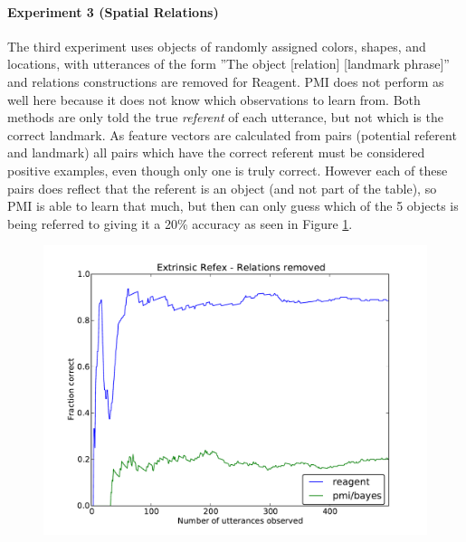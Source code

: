 \documentclass[12pt]{article}
\begin{document}
\paragraph{Experiment 3 (Spatial Relations)}
The third experiment uses objects of randomly assigned colors, shapes, and locations, with utterances of the form ''The object [relation] [landmark phrase]'' and relations constructions are removed for Reagent. PMI does not perform as well here because it does not know which observations to learn from. Both methods are only told the true \textit{referent} of each utterance, but not which is the correct landmark. As feature vectors are calculated from pairs (potential referent and landmark) all pairs which have the correct referent must be considered positive examples, even though only one is truly correct. However each of these pairs does reflect that the referent is an object (and not part of the table), so PMI is able to learn that much, but then can only guess which of the 5 objects is being referred to giving it a 20\% accuracy as seen in Figure \ref{fig:relations}.
\begin{figure}[h!]
\centering
\includegraphics[scale=0.7]{grammar/3_extrinsic_refex_relations.pdf}
\caption{\label{fig:relations}}
\end{figure}
\newpage
\end{document}
